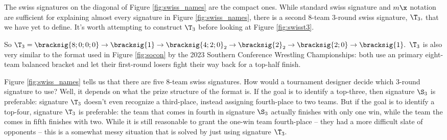 {    The swiss signatures on the diagonal of Figure \ref{fig:swiss_names} are the compact ones. While standard swiss signature and $m\x$ notation are sufficient for explaining almost every signature in Figure \ref{fig:swiss_names}, there is a second 8-team 3-round swiss signature, $\T_3,$ that we have yet to define. It's worth attempting to construct $\T_3$ before looking at Figure \ref{fig:swisst3}.


    So $\T_3 = \bracksig{8;0;0;0} \to \bracksig{1} \to \bracksig{4;2;0}_2 \to \bracksig{2}_2 \to \bracksig{2;0} \to \bracksig{1}.$ $\T_3$ is also very similar to the format used in Figure \ref{fig:socon} by the 2023 Southern Conference Wrestling Championships: both use an primary eight-team balanced bracket and let their first-round losers fight their way back for a top-half finish.


Figure \ref{fig:swiss_names} tells us that there are five $8$-team swiss signatures. How would a tournament designer decide which 3-round signature to use? Well, it depends on what the prize structure of the format is. If the goal is to identify a top-three, then signature $\S_3$ is preferable: signature $\T_3$ doesn't even recognize a third-place, instead assigning fourth-place to two teams. But if the goal is to identify a top-four, signature $\T_3$ is preferable: the team that comes in fourth in signature $\S_3$ actually finishes with only one win, while the team the comes in fifth finishes with two. While it is still reasonable to grant the one-win team fourth-place -- they had a more difficult slate of opponents -- this is a somewhat messy situation that is solved by just using signature $\T_3.$

}
